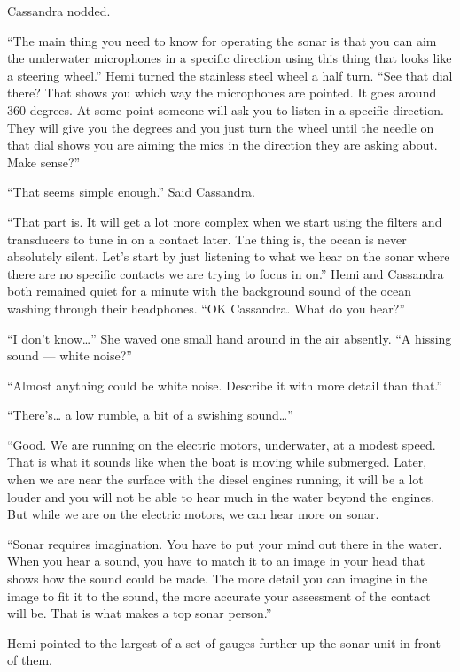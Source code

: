 \documentclass[
]{scrbook}
\begin{document}
Cassandra nodded.

``The main thing you need to know for operating the sonar is that you
can aim the underwater microphones in a specific direction using this
thing that looks like a steering wheel.'' Hemi turned the stainless
steel wheel a half turn. ``See that dial there? That shows you which way
the microphones are pointed. It goes around 360 degrees. At some point
someone will ask you to listen in a specific direction. They will give
you the degrees and you just turn the wheel until the needle on that
dial shows you are aiming the mics in the direction they are asking
about. Make sense?''

``That seems simple enough.'' Said Cassandra.

``That part is. It will get a lot more complex when we start using the
filters and transducers to tune in on a contact later. The thing is, the
ocean is never absolutely silent. Let's start by just listening to what
we hear on the sonar where there are no specific contacts we are trying
to focus in on.'' Hemi and Cassandra both remained quiet for a minute
with the background sound of the ocean washing through their headphones.
``OK Cassandra. What do you hear?''

``I don't know\ldots{}'' She waved one small hand around in the air
absently. ``A hissing sound --- white noise?''

``Almost anything could be white noise. Describe it with more detail
than that.''

``There's\ldots{} a low rumble, a bit of a swishing sound\ldots{}''

``Good. We are running on the electric motors, underwater, at a modest
speed. That is what it sounds like when the boat is moving while
submerged. Later, when we are near the surface with the diesel engines
running, it will be a lot louder and you will not be able to hear much
in the water beyond the engines. But while we are on the electric
motors, we can hear more on sonar.

``Sonar requires imagination. You have to put your mind out there in the
water. When you hear a sound, you have to match it to an image in your
head that shows how the sound could be made. The more detail you can
imagine in the image to fit it to the sound, the more accurate your
assessment of the contact will be. That is what makes a top sonar
person.''

Hemi pointed to the largest of a set of gauges further up the sonar unit
in front of them.
\end{document}
